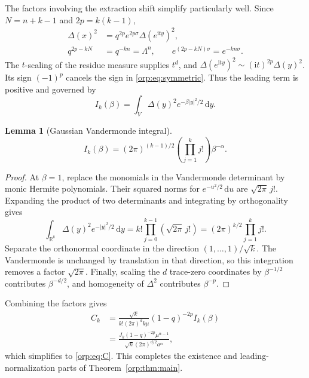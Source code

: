 \documentclass[11pt]{article}
\newtheorem{lemma}[theorem]{Lemma}
\theoremstyle{remark}\newtheorem{remark}[theorem]{Remark}
\newcommand{\R}{\mathbb R}
\newcommand{\ii}{\mathrm i}
\newcommand{\dd}{\,\mathrm d}
\begin{document}
The factors involving the extraction shift simplify particularly well. Since $N=n+k-1$ and $2p=k(k-1)$,
\begin{align}
 \Delta(x)^2&=q^{2p}e^{2p\sigma}\Delta(e^{\ii t y})^2,\nonumber\\
 q^{2p-kN}&=q^{-kn}=\Lambda^n,\qquad
 e^{(2p-kN)\sigma}=e^{-kn\sigma}.\label{orp:eq:shiftcancel}
\end{align}
The $t$-scaling of the residue measure supplies $t^d$, and
$\Delta(e^{\ii t y})^2\sim(\ii t)^{2p}\Delta(y)^2$. Its sign $(-1)^p$ cancels the sign in \eqref{orp:eq:symmetric}. Thus the leading term is positive and governed by
\[
 I_k(\beta)=\int_V\Delta(y)^2e^{-\beta|y|^2/2}\dd y.
\]
\begin{lemma}[Gaussian Vandermonde integral]\label{orp:lem:mehta}
\begin{equation}\label{orp:eq:mehta}
 I_k(\beta)=(2\pi)^{(k-1)/2}\left(\prod_{j=1}^k j!\right)\beta^{-\alpha}.
\end{equation}
\end{lemma}
\begin{proof}
At $\beta=1$, replace the monomials in the Vandermonde determinant by monic Hermite polynomials. Their squared norms for $e^{-u^2/2}\dd u$ are $\sqrt{2\pi}\,j!$. Expanding the product of two determinants and integrating by orthogonality gives
\[
 \int_{\R^k}\Delta(y)^2e^{-|y|^2/2}\dd y
 =k!\prod_{j=0}^{k-1}(\sqrt{2\pi}\,j!)
 =(2\pi)^{k/2}\prod_{j=1}^k j!.
\]
Separate the orthonormal coordinate in the direction $(1,\ldots,1)/\sqrt{k}$. The Vandermonde is unchanged by translation in that direction, so this integration removes a factor $\sqrt{2\pi}$. Finally, scaling the $d$ trace-zero coordinates by $\beta^{-1/2}$ contributes $\beta^{-d/2}$, and homogeneity of $\Delta^2$ contributes $\beta^{-p}$.
\end{proof}
Combining the factors gives
\begin{align}
 C_k&=\frac{\sqrt{k}}{k!(2\pi)^d k\mu}(1-q)^{-2p}I_k(\beta)\label{orp:eq:Cres}\\
 &=\frac{J_k(1-q)^{-2p}\mu^{\alpha-1}}
 {\sqrt{k}(2\pi)^{d/2}a^\alpha},\nonumber
\end{align}
which simplifies to \eqref{orp:eq:C}. This completes the existence and leading-normalization parts of Theorem~\ref{orp:thm:main}.
\end{document}
